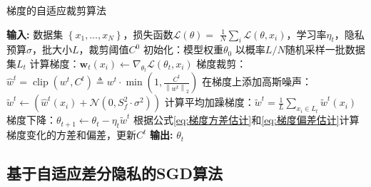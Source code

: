 \begin{algorithm}[!htb]
	\caption{梯度的自适应裁剪算法}
	\label{梯度的自适应裁剪算法}
	\begin{algorithmic}[1]
		\footnotesize
		\STATE \textbf{输入:} 数据集 $\left\{x_{1}, \ldots, x_{N}\right\}$，损失函数$\mathcal{L}(\theta)=$ $\frac{1}{N} \sum_{i} \mathcal{L}\left(\theta, x_{i}\right)$，学习率$\eta_{t}$，隐私预算$\sigma$，批大小$L$，裁剪阈值$C^{0}$
		\STATE 初始化：模型权重$\theta_{0}$
			\STATE 以概率$L / N$随机采样一批数据集$L_{t}$
				\STATE 计算梯度：$\mathbf{w}_{t}\left(x_{i}\right) \leftarrow \nabla_{\theta_{t}} \mathcal{L}\left(\theta_{t}, x_{i}\right)$
				\STATE 梯度裁剪：$\hat{w}^{t}=\operatorname{clip}\left(w^{t}, C^{t}\right) \triangleq w^{t} \cdot \min \left(1, \frac{C^{t}}{\left\|w^{t}\right\|_{2}}\right)$
				\STATE 在梯度上添加高斯噪声：$\tilde{w}^{t}\leftarrow \left(\hat{w}^{t}\left(x_{i}\right)+\mathcal{N}\left(0, S_{f}^{2} \cdot \sigma^{2}\right)\right)$
			\ENDFOR
			\STATE 计算平均加躁梯度：$\tilde{w}^{t}=\frac{1}{L} \sum_{x_{i} \in L_{t}} \tilde{w}^{t}(x_{i})$
			\STATE 梯度下降：$\theta_{t+1} \leftarrow \theta_{t}-\eta_{t} \tilde{w}^{t}$
			\STATE 根据公式\ref{eq:梯度方差估计}和\ref{eq:梯度偏差估计}计算梯度变化的方差和偏差，更新$C^{t}$
		\ENDFOR
		\STATE \textbf{输出:} $\theta_{t}$
	\end{algorithmic}
\end{algorithm}

\subsection{基于自适应差分隐私的SGD算法}

